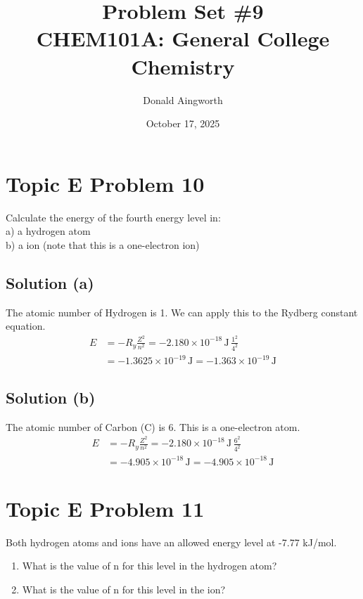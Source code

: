 \documentclass[10pt]{article}
\title{
    Problem Set \#9
    \\  \small
    CHEM101A: General College Chemistry
    }
\author{Donald Aingworth}
\date{October 17, 2025}
\newcommand{\E}[1]{\times 10^{#1}}
\begin{document}

    \maketitle

    \setcounter{section}{9}

    \pagebreak
    \section{Topic E Problem 10}
        Calculate the energy of the fourth energy level in:\\
        a) a hydrogen atom\\ b) a  ion (note that this is a one-electron ion)

        \subsection{Solution (a)}
            The atomic number of Hydrogen is 1.
            We can apply this to the Rydberg constant equation.
            \begin{align}
                E   &=  -R_y \frac{Z^2}{n^2}
                    =   -2.180\E{-18}\,\unit{\joule}\,\frac{1^2}{4^2}\\
                    &=  -1.3625\E{-19}\,\unit{\joule}
                    =   \boxed{-1.363\E{-19}\,\unit{\joule}}
            \end{align}

        \subsection{Solution (b)}
            The atomic number of Carbon (C) is 6.
            This is a one-electron atom.
            \begin{align}
                E   &=  -R_y \frac{Z^2}{n^2}
                    =   -2.180\E{-18}\,\unit{\joule}\,\frac{6^2}{4^2}\\
                    &=  -4.905\E{-18}\,\unit{\joule}
                    =   \boxed{-4.905\E{-18}\,\unit{\joule}}
            \end{align}

    \pagebreak
    \section{Topic E Problem 11}
        Both hydrogen atoms and  ions have an allowed energy level at -7.77 kJ/mol.
        \begin{enumerate}[label=\alph*)]
            \item   What is the value of n for this level in the hydrogen atom?
            \item   What is the value of n for this level in the  ion?
        \end{enumerate}
\end{document}
